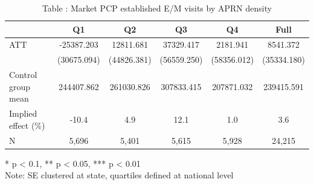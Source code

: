 \begin{table}[t]
\caption*{
{\fontsize{20}{25}\selectfont  Table : Market PCP established E/M visits by APRN density\fontsize{12}{15}\selectfont }
} 
\fontsize{12.0pt}{14.0pt}\selectfont
\begin{tabular*}{\linewidth}{@{\extracolsep{\fill}}lccccc}
\toprule
  & Q1 & Q2 & Q3 & Q4 & Full \\ 
\midrule\addlinespace[2.5pt]
ATT & -25387.203 & 12811.681 & 37329.417 & 2181.941 & 8541.372 \\ 
 & (30675.094) & (44826.381) & (56559.250) & (58356.012) & (35334.180) \\ 
Control group mean & 244407.862 & 261030.826 & 307833.415 & 207871.032 & 239415.591 \\ 
Implied effect (\%) & -10.4 & 4.9 & 12.1 & 1.0 & 3.6 \\ 
N & 5,696 & 5,401 & 5,615 & 5,928 & 24,215 \\ 
\bottomrule
\end{tabular*}
\begin{minipage}{\linewidth}
* p < 0.1, ** p < 0.05, *** p < 0.01\\
Note: SE clustered at state, quartiles defined at national level\\
\end{minipage}
\end{table}

